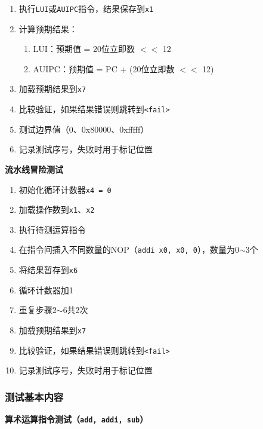 \documentclass[12pt,a4paper]{ctexart}
\newcommand{\code}[1]{\texttt{#1}}
\begin{document}
\begin{enumerate}
    \item 执行\code{LUI}或\code{AUIPC}指令，结果保存到\code{x1}
    \item 计算预期结果：
    \begin{enumerate}
        \item LUI：预期值 = 20位立即数 $<<$ 12
        \item AUIPC：预期值 = PC + (20位立即数 $<<$ 12)
    \end{enumerate}
    \item 加载预期结果到\code{x7}
    \item 比较验证，如果结果错误则跳转到\code{<fail>}
    \item 测试边界值（0、0x80000、0xfffff）
    \item 记录测试序号，失败时用于标记位置
\end{enumerate}

\textbf{流水线冒险测试}

\begin{enumerate}
    \item 初始化循环计数器\code{x4 = 0}
    \item 加载操作数到\code{x1}、\code{x2}
    \item 执行待测运算指令
    \item 在指令间插入不同数量的NOP（\code{addi x0, x0, 0}），数量为0$\sim$3个
    \item 将结果暂存到\code{x6}
    \item 循环计数器加1
    \item 重复步骤2$\sim$6共2次
    \item 加载预期结果到\code{x7}
    \item 比较验证，如果结果错误则跳转到\code{<fail>}
    \item 记录测试序号，失败时用于标记位置
\end{enumerate}

\subsubsection{测试基本内容}

\textbf{算术运算指令测试（\code{add, addi, sub}）}
\end{document}

